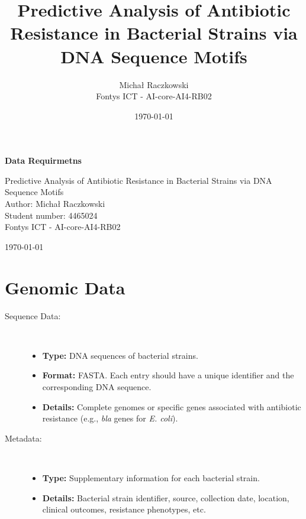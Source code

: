 \documentclass[12pt]{article}
\title{\textbf{Predictive Analysis of Antibiotic Resistance in Bacterial Strains via DNA Sequence Motifs}}
\author{Michał Raczkowski \\
        Fontys ICT - AI-core-AI4-RB02}
\date{\today}
\begin{document}
\begin{titlepage}
    \centering
    \vspace*{\fill}
    {\LARGE \textbf{Data Requirmetns}}
    \bigbreak
    \bigbreak

    {\LARGE {Predictive Analysis of Antibiotic Resistance in Bacterial Strains via DNA Sequence Motifs}}
    \vspace{2cm}\\
    \large{Author: Michał Raczkowski}\\
    {Student number: 4465024 }\\
    {Fontys ICT - 
    AI-core-AI4-RB02
    }

    \vspace{2cm}
    \today
    \vspace*{\fill}
\end{titlepage}

\tableofcontents
\newpage

\section{Genomic Data}
\begin{description}
    \item[Sequence Data:] \
    \begin{itemize}
        \item \textbf{Type:} DNA sequences of bacterial strains.
        \item \textbf{Format:} FASTA. Each entry should have a unique identifier and the corresponding DNA sequence.
        \item \textbf{Details:} Complete genomes or specific genes associated with antibiotic resistance (e.g., \textit{bla} genes for \textit{E. coli}).
    \end{itemize} 
    \item[Metadata:] \
    \begin{itemize}
        \item \textbf{Type:} Supplementary information for each bacterial strain.
        \item \textbf{Details:} Bacterial strain identifier, source, collection date, location, clinical outcomes, resistance phenotypes, etc.
    \end{itemize}
\end{description}
\end{document}
